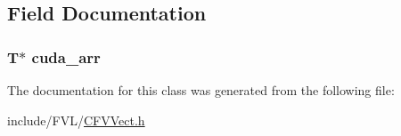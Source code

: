 \subsection{Field Documentation}
\hypertarget{classFVL_1_1CFVVect_ac7c2eda2752dff79215dfcc062d0d814}{
\subsubsection[{cuda\_\-arr}]{\setlength{\rightskip}{0pt plus 5cm}T$\ast$ {\bf cuda\_\-arr}}}
\label{db/da6/classFVL_1_1CFVVect_ac7c2eda2752dff79215dfcc062d0d814}


The documentation for this class was generated from the following file:\begin{DoxyCompactItemize}
\item 
include/FVL/\hyperlink{CFVVect_8h}{CFVVect.h}\end{DoxyCompactItemize}
